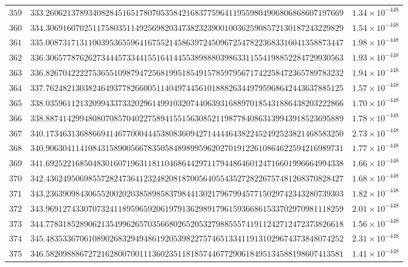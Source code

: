 \documentclass[12pt,reqno]{amsart}
\theoremstyle{remark}
\begin{document}
\begin{longtable}{clc}
$359$ & $333.2606213789340828451651780705358421683775964119559804906806868607197669$ & $1.34\times 10^{-448}$ \\
$360$ & $334.3069160702511758035114925698203473823239001003625908572130187243229829$ & $1.54\times 10^{-448}$ \\
$361$ & $335.0087317131100395365596416755214586397245096725478223683316041358873447$ & $1.98\times 10^{-448}$ \\
$362$ & $336.3065778762627344457334415516414455389888039863311554198852284729930563$ & $1.93\times 10^{-448}$ \\
$363$ & $336.8267042222753655109879472568199518549157859795671742258472365789783232$ & $1.94\times 10^{-448}$ \\
$364$ & $337.7624821303824649377826600511404974456101888263449795968642443637885125$ & $1.57\times 10^{-448}$ \\
$365$ & $338.0359611213209943373320296149910320744063931688970185431886438203222866$ & $1.70\times 10^{-448}$ \\
$366$ & $338.8874142994808070857040227589415515630852119877840863139943918523695889$ & $1.78\times 10^{-448}$ \\
$367$ & $340.1734631368866941467700044453808360942714444643822452492523821468583250$ & $2.73\times 10^{-448}$ \\
$368$ & $340.9063041141084315890056678350584898995962027019122610864622594216989731$ & $1.77\times 10^{-448}$ \\
$369$ & $341.6925221685048301607196311811046864429711794486460124716601996664994338$ & $1.66\times 10^{-448}$ \\
$370$ & $342.4362495069855728247364123248208187005640554352728226757481268370828427$ & $1.68\times 10^{-448}$ \\
$371$ & $343.2363909843065520020203858985837984413021796799457715029742343280739303$ & $1.82\times 10^{-448}$ \\
$372$ & $343.9691274330707324118959659206197913629891796159366861533702970981118259$ & $2.01\times 10^{-448}$ \\
$373$ & $344.7783185289062135499626570356680265205327988555741911242712472373826618$ & $1.56\times 10^{-448}$ \\
$374$ & $345.4835336706108902683294948619205398227574651334119131029674373848074252$ & $2.31\times 10^{-448}$ \\
$375$ & $346.5820988867272162800700111360235118185744677290618495134588198607413581$ & $1.41\times 10^{-448}$ \\

\end{longtable}
\end{document}
